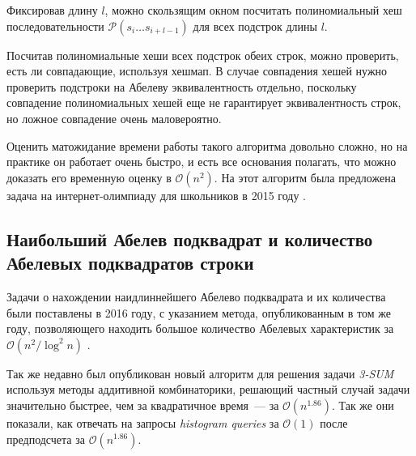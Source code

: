 Фиксировав длину $l$, можно скользящим окном посчитать полиномиальный хеш последовательности $\mathcal{P}(s_i\ldots s_{i+l-1})$ для всех подстрок длины $l$. 

Посчитав полиномиальные хеши всех подстрок обеих строк, можно проверить, есть ли совпадающие, используя хешмап. В случае совпадения хешей нужно проверить подстроки на Абелеву эквивалентность отдельно, поскольку совпадение полиномиальных хешей еще не гарантирует эквивалентность строк, но ложное совпадение очень маловероятно.

Оценить матожидание времени работы такого алгоритма довольно сложно, но на практике он работает очень быстро, и есть все основания полагать, что можно доказать его временную оценку в $\mathcal{O}(n^2)$. На этот алгоритм была предложена задача на интернет-олимпиаду для школьников в 2015 году \cite{6}.

\subsection{Наибольший Абелев подквадрат и количество Абелевых подквадратов строки}
Задачи о нахождении наидлиннейшего Абелево подквадрата и их количества были поставлены в 2016 году, с указанием метода, опубликованным в том же году, позволяющего находить большое количество Абелевых характеристик за $\mathcal{O}(n^2 / \log^2 n)$ \cite{5}.

Так же недавно был опубликован новый алгоритм для решения задачи \textit{3-SUM} используя методы аддитивной комбинаторики, решающий частный случай задачи значительно быстрее, чем за квадратичное время~--- за $\mathcal{O}(n^{1.86})$. Так же они показали, как отвечать на запросы \textit{histogram queries} за $\mathcal{O}(1)$ после предподсчета за $\mathcal{O}(n^{1.86})$.